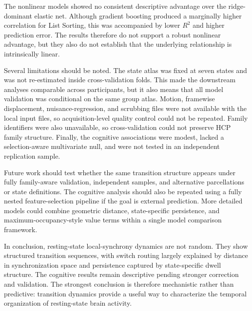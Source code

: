 \documentclass[12pt,a4paper]{report}
\begin{document}
\begin{sloppypar}
The nonlinear models showed no consistent descriptive advantage over the ridge-dominant elastic
net. Although gradient boosting produced a marginally higher correlation for List Sorting, this
was accompanied by lower $R^2$ and higher prediction error. The results therefore do not support
a robust nonlinear advantage, but they also do not establish that the underlying relationship is
intrinsically linear.
\end{sloppypar}

Several limitations should be noted. The state atlas was fixed at seven states and was not
re-estimated inside cross-validation folds. This made the downstream analyses comparable across
participants, but it also means that all model validation was conditional on the same group atlas.
Motion, framewise displacement, nuisance-regression, and scrubbing files were not available
with the local input files, so acquisition-level quality control could not be repeated. Family
identifiers were also unavailable, so cross-validation could not preserve HCP family structure.
Finally, the cognitive associations were modest, lacked a selection-aware multivariate null, and
were not tested in an independent replication sample.

Future work should test whether the same transition structure appears under fully family-aware
validation, independent samples, and alternative parcellations or state definitions. The cognitive
analysis should also be repeated using a fully nested feature-selection pipeline if the goal is
external prediction. More detailed models could combine geometric distance, state-specific
persistence, and maximum-occupancy-style value terms within a single model comparison
framework.

In conclusion, resting-state local-synchrony dynamics are not random. They show structured
transition sequences, with switch routing largely explained by distance in synchronization space
and persistence captured by state-specific dwell structure. The cognitive results remain
descriptive pending stronger correction and validation. The strongest conclusion is therefore
mechanistic rather than predictive: transition dynamics provide a useful way to characterize the
temporal organization of resting-state brain activity.

\clearpage
\end{document}
